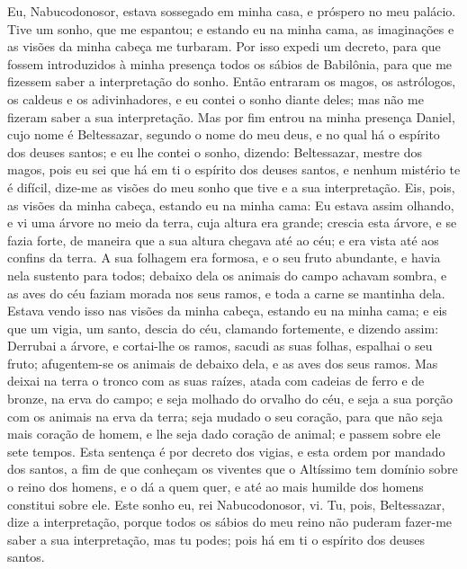 Eu, Nabucodonosor, estava sossegado em minha casa, e próspero no
meu palácio. Tive um sonho, que me espantou; e estando eu na
minha cama, as imaginações e as visões da minha cabeça me turbaram.
Por isso expedi um decreto, para que fossem introduzidos à minha
presença todos os sábios de Babilônia, para que me fizessem saber a
interpretação do sonho. Então entraram os magos, os astrólogos,
os caldeus e os adivinhadores, e eu contei o sonho diante deles; mas
não me fizeram saber a sua interpretação. Mas por fim entrou na
minha presença Daniel, cujo nome é Beltessazar, segundo o nome do
meu deus, e no qual há o espírito dos deuses santos; e eu lhe contei
o sonho, dizendo: Beltessazar, mestre dos magos, pois eu sei que
há em ti o espírito dos deuses santos, e nenhum mistério te é
difícil, dize-me as visões do meu sonho que tive e a sua
interpretação. Eis, pois, as visões da minha cabeça, estando
eu na minha cama: Eu estava assim olhando, e vi uma árvore no meio
da terra, cuja altura era grande; crescia esta árvore, e se
fazia forte, de maneira que a sua altura chegava até ao céu; e era
vista até aos confins da terra. A sua folhagem era formosa, e
o seu fruto abundante, e havia nela sustento para todos; debaixo
dela os animais do campo achavam sombra, e as aves do céu faziam
morada nos seus ramos, e toda a carne se mantinha dela.
Estava vendo isso nas visões da minha cabeça, estando eu na
minha cama; e eis que um vigia, um santo, descia do céu,
clamando fortemente, e dizendo assim: Derrubai a árvore, e
cortai-lhe os ramos, sacudi as suas folhas, espalhai o seu fruto;
afugentem-se os animais de debaixo dela, e as aves dos seus ramos.
Mas deixai na terra o tronco com as suas raízes, atada com
cadeias de ferro e de bronze, na erva do campo; e seja molhado do
orvalho do céu, e seja a sua porção com os animais na erva da terra;
seja mudado o seu coração, para que não seja mais coração de
homem, e lhe seja dado coração de animal; e passem sobre ele sete
tempos. Esta sentença é por decreto dos vigias, e esta ordem
por mandado dos santos, a fim de que conheçam os viventes que o
Altíssimo tem domínio sobre o reino dos homens, e o dá a quem quer,
e até ao mais humilde dos homens constitui sobre ele. Este
sonho eu, rei Nabucodonosor, vi. Tu, pois, Beltessazar, dize a
interpretação, porque todos os sábios do meu reino não puderam
fazer-me saber a sua interpretação, mas tu podes; pois há em ti o
espírito dos deuses santos.

